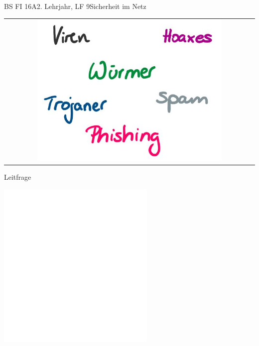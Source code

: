 \documentclass[oneside,openany,headings=optiontotoc,11pt,numbers=noenddot]{scrreprt}
\begin{document}
	\begin{worksheet}{BS FI 16A}{2. Lehrjahr, LF 9}{Sicherheit im Netz}
		
		\noindent
		\begin{framed}
			\begin{tabular}{lcr}
				& \includegraphics[width=0.8\textwidth]{Gefahren.jpg} &
			\end{tabular}
		\end{framed}

		\setlength{\fboxsep}{1mm}
		\begin{framed}
			\tiny{\color{codegray}Leitfrage}
			\par
			\bigskip
		\end{framed}
	
		\begin{framed}
			\includegraphics[width=0.57\textwidth]{empty.jpg}
		\end{framed}
		
	\end{worksheet}
\end{document}
